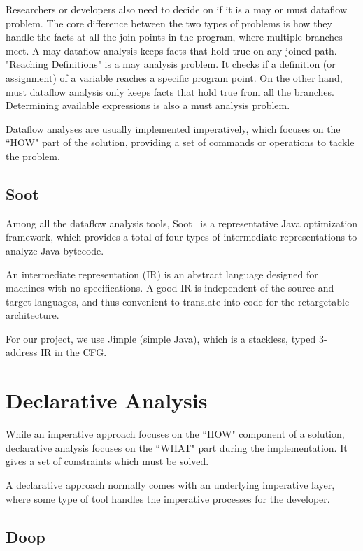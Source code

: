 Researchers or developers also need to decide on if it is a may or must dataflow problem. The core difference between the two types of problems is how they handle the facts at all the join points in the program, where multiple branches meet. A may dataflow analysis keeps facts that hold true on any joined path. "Reaching Definitions" is a may analysis problem. It checks if a definition (or assignment) of a variable reaches a specific program point. On the other hand, must dataflow analysis only keeps facts that hold true from all the branches. Determining available expressions is also a must analysis problem.

Dataflow analyses are usually implemented imperatively, which focuses on the ``HOW" part of the solution, providing a set of commands or operations to tackle the problem.

\subsection{Soot}

Among all the dataflow analysis tools, Soot~\cite{Vallee-Rai:1999:SJB:781995.782008} is a representative Java optimization framework, which provides a total of four types of intermediate representations to analyze Java bytecode. 

An intermediate representation (IR) is an abstract language designed for machines with no specifications. A good IR is independent of the source and target languages, and thus convenient to translate into code for the retargetable architecture.

For our project, we use Jimple (simple Java), which is a stackless, typed 3-address IR in the CFG.

\section{Declarative Analysis}

While an imperative approach focuses on the ``HOW" component of a solution, declarative analysis focuses on the ``WHAT" part during the implementation. It gives a set of constraints which must be solved.

A declarative approach normally comes with an underlying imperative layer, where some type of tool handles the imperative processes for the developer.

\subsection{Doop}

